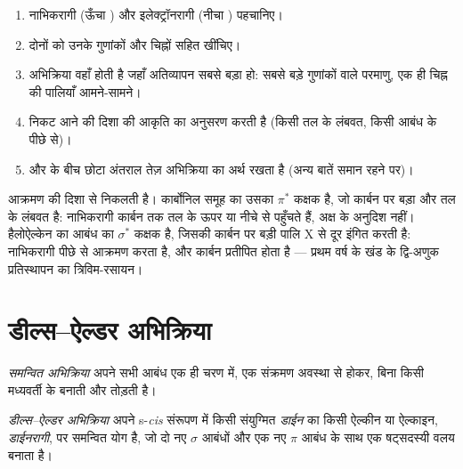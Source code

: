 \begin{method}[अग्रांत-कक्षक विश्लेषण]\label{met:b2:frontier-orbitals:fmo}
\begin{enumerate}
  \item नाभिकरागी (ऊँचा ) और इलेक्ट्रॉनरागी (नीचा ) पहचानिए।
  \item दोनों  को उनके गुणांकों और चिह्नों सहित खींचिए।
  \item अभिक्रिया वहाँ होती है जहाँ अतिव्यापन सबसे बड़ा हो: सबसे बड़े
        गुणांकों वाले परमाणु, एक ही चिह्न की पालियाँ आमने-सामने।
  \item निकट आने की दिशा  की आकृति का अनुसरण करती है (किसी
         तल के लंबवत, किसी  आबंध के पीछे से)।
  \item {} और  के बीच छोटा अंतराल तेज़ अभिक्रिया का अर्थ रखता है (अन्य बातें समान रहने पर)।
\end{enumerate}
\end{method}

आक्रमण की दिशा  से निकलती है। कार्बोनिल समूह का  उसका
$\pi^*$ कक्षक है, जो कार्बन पर बड़ा और तल के लंबवत है: नाभिकरागी
कार्बन तक तल के ऊपर या नीचे से पहुँचते हैं,  अक्ष के अनुदिश नहीं।
हैलोऐल्केन का   आबंध का $\sigma^*$ कक्षक है, जिसकी कार्बन पर बड़ी पालि
X से दूर इंगित करती है: नाभिकरागी पीछे से आक्रमण करता है, और कार्बन प्रतीपित होता है
--- प्रथम वर्ष के खंड के द्वि-अणुक प्रतिस्थापन का त्रिविम-रसायन।

\section{डील्स--ऐल्डर अभिक्रिया}

\begin{definition}[समन्वित अभिक्रिया]\label{def:b2:frontier-orbitals:concerted}
\emph{समन्वित अभिक्रिया} अपने सभी आबंध
एक ही चरण में, एक संक्रमण अवस्था से होकर, बिना किसी मध्यवर्ती के बनाती और तोड़ती है।
\end{definition}

\begin{definition}[डील्स--ऐल्डर अभिक्रिया]\label{def:b2:frontier-orbitals:diels-alder}
\emph{डील्स--ऐल्डर अभिक्रिया} अपने s-\textit{cis} संरूपण में किसी
संयुग्मित \emph{डाईन} का किसी ऐल्कीन या
ऐल्काइन, \emph{डाईनरागी}, पर समन्वित योग है, जो दो
नए $\sigma$ आबंधों और एक नए $\pi$ आबंध के साथ एक षट्सदस्यी वलय बनाता है।
\end{definition}

